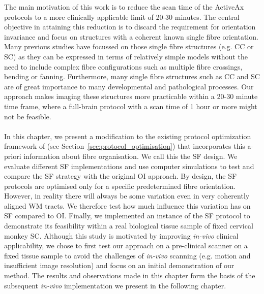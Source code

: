 The main motivation of this work is to reduce the scan time of the ActiveAx protocols to a more clinically applicable limit of 20-30 minutes. The central objective in attaining this reduction is to discard the requirement for orientation invariance and focus on structures with a coherent known single fibre orientation. Many previous studies have focussed on those single fibre structures (e.g. \gls{CC} or \gls{SC}) as they can be expressed in terms of relatively simple models without the need to include complex fibre configurations such as multiple fibre crossings, bending or fanning. Furthermore, many single fibre structures such as \gls{CC} and \gls{SC} are of great importance to many developmental and pathological processes. Our approach makes imaging these structures more practicable within a 20-30 minute time frame, where a full-brain protocol with a scan time of 1 hour or more might not be feasible.
\paragraph{}
In this chapter, we present a modification to the existing protocol optimization framework of \cite{Alexander:2008} (see Section~\ref{sec:protocol_optimisation}) that incorporates this a-priori information about fibre organisation. We call this the  \gls{SF} design. We evaluate different \gls{SF} implementations and use computer simulations to test and compare the \gls{SF} strategy with the original \gls{OI} approach. By design, the {\gls{SF}} protocols are optimised only for a specific predetermined fibre orientation. However, in reality there will always be some variation even in very coherently aligned \gls{WM} tracts. We therefore test how much influence this variation has on \gls{SF} compared to \gls{OI}. Finally, we implemented an instance of the {\gls{SF}} protocol to demonstrate its feasibility within a real biological tissue sample of fixed cervical monkey \gls{SC}. Although this study is motivated by improving \emph{in-vivo} clinical applicability, we chose to first test our approach on a pre-clinical scanner on a fixed tissue sample to avoid the challenges of \emph{in-vivo} scanning (e.g. motion and insufficient image resolution) and focus on an initial demonstration of our method. The results and observations made in this chapter form the basis of the subsequent \emph{in-vivo} implementation we present in the following chapter.

